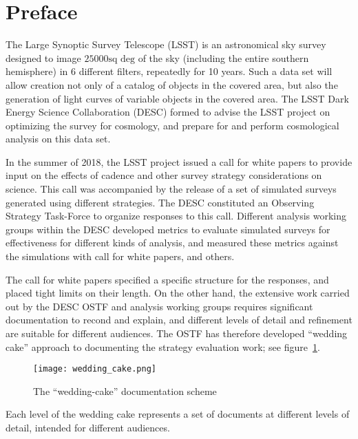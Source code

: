 \section*{Preface}

The Large Synoptic Survey Telescope (LSST) is an astronomical sky
survey designed to image $25000\mbox{sq deg}$ of the sky (including
the entire southern hemisphere) in 6 different filters, repeatedly for
10 years. Such a data set will allow creation not only of a catalog of
objects in the covered area, but also the generation of light curves
of variable objects in the covered area. The LSST Dark Energy Science
Collaboration (DESC) formed to advise the LSST project on optimizing
the survey for cosmology, and prepare for and perform cosmological
analysis on this data set.

In the summer of 2018, the LSST project issued a call for white papers
to provide input on the effects of cadence and other survey strategy
considerations on science. This call was accompanied by the release of
a set of simulated surveys generated using different strategies. The
DESC constituted an Observing Strategy Task-Force to organize
responses to this call. Different analysis working groups within the
DESC developed metrics to evaluate simulated surveys for effectiveness
for different kinds of analysis, and measured these metrics against
the simulations with call for white papers, and others.

The call for white papers specified a specific structure for the
responses, and placed tight limits on their length. On the other hand,
the extensive work carried out by the DESC OSTF and analysis working
groups requires significant documentation to recond and explain, and
different levels of detail and refinement are suitable for different
audiences. The OSTF has therefore developed ``wedding cake'' approach
to documenting the strategy evaluation work; see
figure~\ref{fig:weddingcake}.

\begin{figure}[here]
  \centering
  \texttt{[image: wedding\_cake.png]}
  \caption{The ``wedding-cake'' documentation scheme}
  \label{fig:weddingcake}
\end{figure}

Each level of the wedding cake represents a set of documents at
different levels of detail, intended for different audiences.

